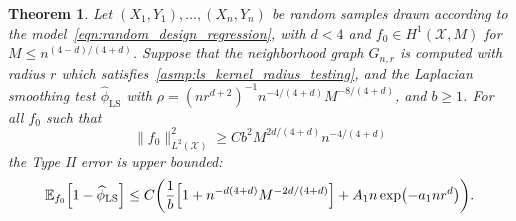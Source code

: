 \documentclass[twoside]{article}
\newcommand{\1}{\mathbf{1}}
\newcommand{\Xset}{\mathcal{X}}
\newcommand{\Leb}{L}
\newcommand{\Ebb}{\mathbb{E}}
\newcommand{\wh}[1]{\widehat{#1}}
\newcommand{\LS}{\mathrm{LS}}
\newtheorem{theorem}{Theorem}
\theoremstyle{definition}
\theoremstyle{remark}
\begin{document}
\begin{theorem}
	\label{thm:laplacian_smoothing_testing}
	Let $(X_1,Y_1),\ldots,(X_n,Y_n)$ be random samples drawn according to the model~\eqref{eqn:random_design_regression}, with $d < 4$ and $f_0 \in H^1(\Xset,M)$ for $M \leq n^{(4 - d)/(4 + d)}$. Suppose that the neighborhood graph $G_{n,r}$ is computed with radius $r$ which satisfies~\ref{asmp:ls_kernel_radius_testing}, and the Laplacian smoothing test $\wh{\phi}_{\LS}$ with $\rho = (nr^{d + 2})^{-1} n^{-4/(4 + d)} M^{-8/(4 + d)}$, and $b \geq 1$. For all $f_0$ such that
	\begin{equation}
	\label{eqn:laplacian_smoothing_testing}
	\bigl\|f_0\bigr\|_{\Leb^2(\Xset)}^2 \geq C b^2 M^{2d/(4 + d)} n^{-4/(4 + d)}
	\end{equation} 
	the Type II error is upper bounded:
	\begin{equation*}
	\Ebb_{f_0}\Bigl[1 - \wh{\phi}_{\LS} \Bigr] \leq C\biggl(\frac{1}{b}\Bigl[1 + n^{-d(4 + d)}M^{-2d/(4 + d)}\Bigr] + A_1n\exp\bigl(-a_1nr^d\bigr)\biggr).
	\end{equation*}
\end{theorem}
\end{document}
